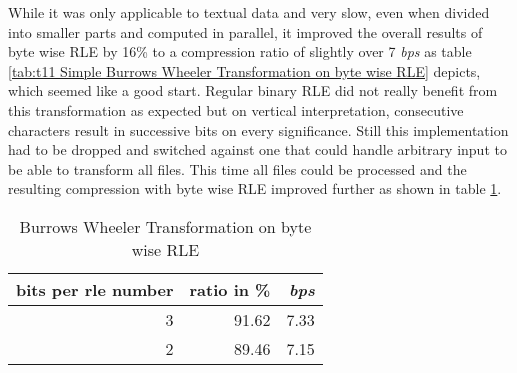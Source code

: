\par{
While it was only applicable to textual data and very slow, even when divided into smaller parts and computed in parallel, it improved the overall results of byte wise RLE by 16\% to a compression ratio of slightly over 7 \textit{bps} as table \ref{tab:t11 Simple Burrows Wheeler Transformation on byte wise RLE} depicts, which seemed like a good start. Regular binary RLE did not really benefit from this transformation as expected but on vertical interpretation, consecutive characters result in successive bits on every significance. Still this implementation had to be dropped and switched against one that could handle arbitrary input to be able to transform all files. This time all files could be processed and the resulting compression with byte wise RLE improved further as shown in table \ref{tab:t12 Burrows Wheeler Transformation on byte wise RLE}.
\begin{table}[h]
	\centering
	\begin{tabular}{r|r|r}	
		bits per rle number & ratio in \% & \textit{bps}\\
		\hline
		3 & 91.62 & 7.33\\
		2 & 89.46 & 7.15
	\end{tabular}
	\caption{Burrows Wheeler Transformation on byte wise RLE}
	\label{tab:t12 Burrows Wheeler Transformation on byte wise RLE}
\end{table}
}

